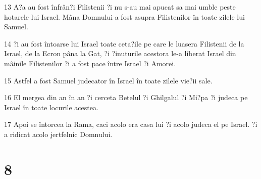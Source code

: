 \par 13 A?a au fost înfrân?i Filistenii ?i nu s-au mai apucat sa mai umble peste hotarele lui Israel. Mâna Domnului a fost asupra Filistenilor în toate zilele lui Samuel.
\par 14 ?i au fost întoarse lui Israel toate ceta?ile pe care le luasera Filistenii de la Israel, de la Ecron pâna la Gat, ?i ?inuturile acestora le-a liberat Israel din mâinile Filistenilor ?i a fost pace între Israel ?i Amorei.
\par 15 Astfel a fost Samuel judecator în Israel în toate zilele vie?ii sale.
\par 16 El mergea din an în an ?i cerceta Betelul ?i Ghilgalul ?i Mi?pa ?i judeca pe Israel în toate locurile acestea.
\par 17 Apoi se întorcea la Rama, caci acolo era casa lui ?i acolo judeca el pe Israel. ?i a ridicat acolo jertfelnic Domnului.

\chapter{8}


